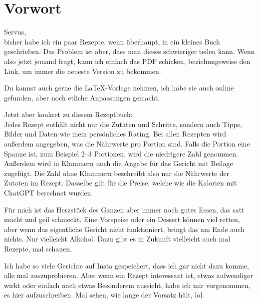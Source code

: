 \documentclass[
  a4paper,
  twoside,
  11pt
]{article}
\begin{document}
\cookbooktitlepage
\cookbooktocpage


\section{Vorwort}

Servus,\\
bisher habe ich ein paar Rezepte, wenn überhaupt, in ein kleines Buch geschrieben. Das Problem ist aber, dass man dieses schwieriger teilen kann. Wenn also jetzt jemand fragt, kann ich einfach das PDF schicken, beziehungsweise den Link, um immer die neueste Version zu bekommen.

Du kannst auch gerne die LaTeX-Vorlage nehmen, ich habe sie auch online gefunden, aber noch etliche Anpassungen gemacht.

Jetzt aber konkret zu diesem Rezeptbuch:\\
Jedes Rezept enthält nicht nur die Zutaten und Schritte, sondern auch Tipps, Bilder und Daten wie mein persönliches Rating. Bei allen Rezepten wird außerdem angegeben, was die Nährwerte pro Portion sind. Falls die Portion eine Spanne ist, zum Beispiel 2--3 Portionen, wird die niedrigere Zahl genommen. Außerdem wird in Klammern noch die Angabe für das Gericht mit Beilage zugefügt. Die Zahl ohne Klammern beschreibt also nur die Nährwerte der Zutaten im Rezept. Dasselbe gilt für die Preise, welche wie die Kalorien mit ChatGPT berechnet wurden.

Für mich ist das Herzstück des Ganzen aber immer noch gutes Essen, das satt macht und geil schmeckt. Eine Vorspeise oder ein Dessert können viel retten, aber wenn das eigentliche Gericht nicht funktioniert, bringt das am Ende auch nichts. Nur vielleicht Alkohol. Dazu gibt es in Zukunft vielleicht auch mal Rezepte, mal schauen.

Ich habe so viele Gerichte auf Insta gespeichert, dass ich gar nicht dazu komme, alle mal auszuprobieren. Aber wenn ein Rezept interessant ist, etwas aufwendiger wirkt oder einfach nach etwas Besonderem aussieht, habe ich mir vorgenommen, es hier aufzuschreiben. Mal sehen, wie lange der Vorsatz hält, lol.
\end{document}

